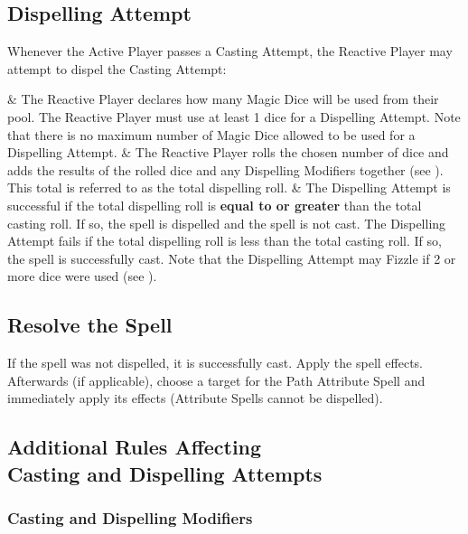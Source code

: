 \columnbreak

\subsection{Dispelling Attempt}

Whenever the Active Player passes a Casting Attempt, the Reactive Player may attempt to dispel the Casting Attempt:

 & The Reactive Player declares how many Magic Dice will be used from their pool. The Reactive Player must use at least 1 dice for a Dispelling Attempt. Note that there is no maximum number of Magic Dice allowed to be used for a Dispelling Attempt.  & The Reactive Player rolls the chosen number of dice and adds the results of the rolled dice and any Dispelling Modifiers together (see ). This total is referred to as the total dispelling roll.  & The Dispelling Attempt is successful if the total dispelling roll is \textbf{equal to or greater} than the total casting roll. If so, the spell is dispelled and the spell is not cast. The Dispelling Attempt fails if the total dispelling roll is less than the total casting roll. If so, the spell is successfully cast. Note that the Dispelling Attempt may Fizzle if 2 or more dice were used (see ). \tabularnewline
\closeseqtablemc

\subsection{Resolve the Spell}

If the spell was not dispelled, it is successfully cast. Apply the spell effects. Afterwards (if applicable), choose a target for the Path Attribute Spell and immediately apply its effects (Attribute Spells cannot be dispelled).

\subsection[Additional Rules Affecting Casting and Dispelling Attempts]{Additional Rules Affecting\\ Casting and Dispelling Attempts}

\subsubsection{Casting and Dispelling Modifiers}
\label{casting_and_dispelling_modifiers}

